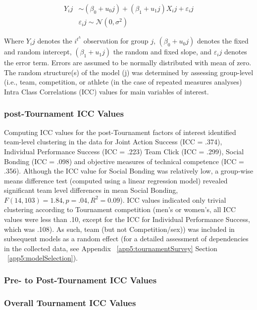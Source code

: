 \begin{landscape}
  \begin{equation}
    \begin{align*}
      Y_ij & \sim  (\beta_0 + u_0j) + (\beta_1 + u_1j)X_ij + \varepsilon_ij\\
           & \varepsilon_ij \sim \mathcal{N}(0,\sigma^{2})
    \end{align*}
  \end{equation}

Where $Y_ij$ denotes the $i^t^h$ observation for group $j$, $(\beta_0 + u_0j)$ denotes the fixed and random intercept, $(\beta_1 + u_1j)$ the random and fixed slope, and $\varepsilon_ij$ denotes the error term.  Errors are assumed to be normally distributed with mean of zero.  The random structure(s) of the model (j) was determined by assessing  group-level (i.e., team, competition, or athlete (in the case of repeated measures analyses) Intra Class Correlations (ICC) values for main variables of interest.

\subsubsection{post-Tournament ICC Values}
Computing ICC values for the post-Tournament factors of interest identified team-level clustering in the data for Joint Action Success (ICC = .374), Individual Performance Success (ICC = .223) Team Click (ICC = .299), Social Bonding (ICC = .098) and objective measures of technical competence (ICC = .356). Although the ICC value for Social Bonding was relatively low, a group-wise means difference test (computed using a linear regression model) revealed significant team level differences in mean Social Bonding, $F(14, 103) = 1.84, p = .04, R^2 = 0.09$). ICC values indicated only trivial clustering according to Tournament competition (men's or women's, all ICC values were less than .10, except for the ICC for Individual Performance Success, which was .108).  As such, team (but not Competition/sex)) was included in subsequent models as a random effect (for a detailed assessment of dependencies in the collected data, see Appendix ~\ref{app5:tournamentSurvey} Section ~\ref{app5:modelSelection}).


\subsubsection{Pre- to Post-Tournament ICC Values}

\subsubsection{Overall Tournament ICC Values}






\end{landscape}
